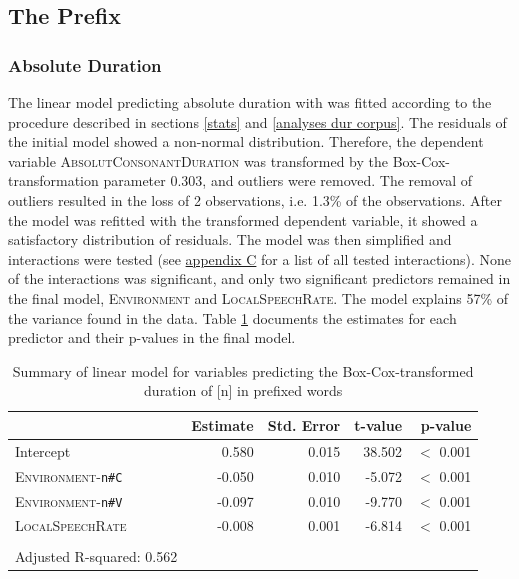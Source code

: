 \subsection{The Prefix } \label{un corpus}

\subsubsection{Absolute Duration}

The linear model predicting absolute duration with  was fitted according to the procedure described in sections \ref{stats} and \ref{analyses dur corpus}. 
The residuals of the initial model showed a non-normal distribution. Therefore, the dependent variable \textsc{AbsolutConsonantDuration} was transformed by the Box-Cox-transformation parameter $0.303$, and outliers were removed. The removal of outliers resulted in the loss of  2 observations, i.e. 1.3\% of the observations. After the model was refitted with the transformed dependent variable, it showed a satisfactory distribution of residuals. The model was then simplified and interactions were tested  (see \hyperref[Appendix C: Summaries of tested interactions in corpus study]{appendix C} for a list of all tested interactions).
None of the interactions was significant, and only two significant predictors remained in the final model, \textsc{Environment} and  \textsc{LocalSpeechRate}. The model explains 57\% of the variance found in the data. Table \ref{tbl: summary model un} documents the estimates for each predictor and their p-values in the final model.

\begin{table}[!h]
	\caption{Summary of linear model for variables predicting the Box-Cox-transformed duration of [n] in prefixed words}
	\label{tbl: summary model un}
	\begin{center}
		
		
		\begin{tabular}{lrrrr}
			\hline
			& Estimate & Std. Error & t-value & p-value  \\ 
			\hline
			Intercept                           &   0.580 &  0.015  & 38.502 &  $<$ 0.001\\
			\textsc{Environment}-\texttt{n\#C} & -0.050 &  0.010 & -5.072 & $<$ 0.001\\
			\textsc{Environment}-\texttt{n\#V} & -0.097 &   0.010 & -9.770 & $<$ 0.001\\
			\textsc{LocalSpeechRate} &                 -0.008  & 0.001 &  -6.814 & $<$ 0.001\\
			
			\hline\\
			Adjusted R-squared: 0.562  
		\end{tabular}
\vspace*{-0.2cm}
	\end{center}
\end{table}


